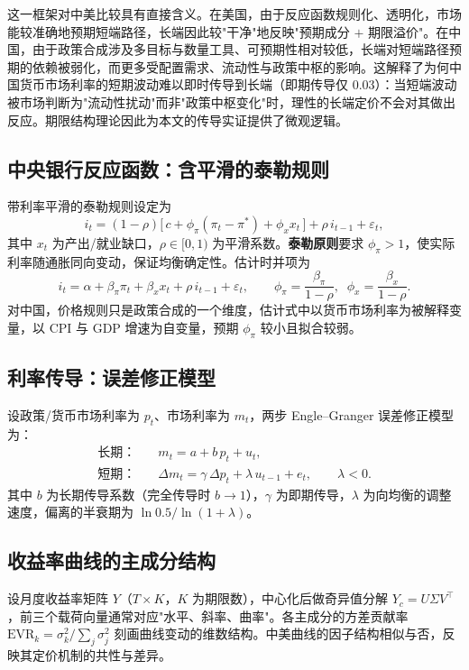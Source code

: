 \documentclass[12pt,a4paper]{ctexart}
\begin{document}
这一框架对中美比较具有直接含义。在美国，由于反应函数规则化、透明化，市场能较准确地预期短端路径，长端因此较"干净"地反映"预期成分 $+$ 期限溢价"。在中国，由于政策合成涉及多目标与数量工具、可预期性相对较低，长端对短端路径预期的依赖被弱化，而更多受配置需求、流动性与政策中枢的影响。这解释了为何中国货币市场利率的短期波动难以即时传导到长端（即期传导仅 0.03）：当短端波动被市场判断为"流动性扰动"而非"政策中枢变化"时，理性的长端定价不会对其做出反应。期限结构理论因此为本文的传导实证提供了微观逻辑。

\subsection{中央银行反应函数：含平滑的泰勒规则}
带利率平滑的泰勒规则设定为
\begin{equation}
i_t = (1-\rho)\big[\, c + \phi_\pi(\pi_t-\pi^{*}) + \phi_x x_t \,\big] + \rho\, i_{t-1} + \varepsilon_t,
\label{eq:taylor}
\end{equation}
其中 $x_t$ 为产出/就业缺口，$\rho\in[0,1)$ 为平滑系数。\textbf{泰勒原则}要求 $\phi_\pi>1$，使实际利率随通胀同向变动，保证均衡确定性。估计时并项为
\begin{equation}
i_t = \alpha + \beta_\pi \pi_t + \beta_x x_t + \rho\, i_{t-1} + \varepsilon_t,\qquad
\phi_\pi=\frac{\beta_\pi}{1-\rho},\;\; \phi_x=\frac{\beta_x}{1-\rho}.
\end{equation}
对中国，价格规则只是政策合成的一个维度，估计式中以货币市场利率为被解释变量，以 CPI 与 GDP 增速为自变量，预期 $\phi_\pi$ 较小且拟合较弱。

\subsection{利率传导：误差修正模型}
设政策/货币市场利率为 $p_t$、市场利率为 $m_t$，两步 Engle--Granger 误差修正模型为：
\begin{align}
\text{长期：}\quad & m_t = a + b\, p_t + u_t, \\
\text{短期：}\quad & \Delta m_t = \gamma\,\Delta p_t + \lambda\, u_{t-1} + e_t,\qquad \lambda<0.
\end{align}
其中 $b$ 为长期传导系数（完全传导时 $b\to 1$），$\gamma$ 为即期传导，$\lambda$ 为向均衡的调整速度，偏离的半衰期为 $\ln 0.5/\ln(1+\lambda)$。

\subsection{收益率曲线的主成分结构}
设月度收益率矩阵 $Y$（$T\times K$，$K$ 为期限数），中心化后做奇异值分解 $Y_c = U\Sigma V^\top$，前三个载荷向量通常对应"水平、斜率、曲率"。各主成分的方差贡献率 $\text{EVR}_k=\sigma_k^2/\sum_j\sigma_j^2$ 刻画曲线变动的维数结构。中美曲线的因子结构相似与否，反映其定价机制的共性与差异。
\end{document}
